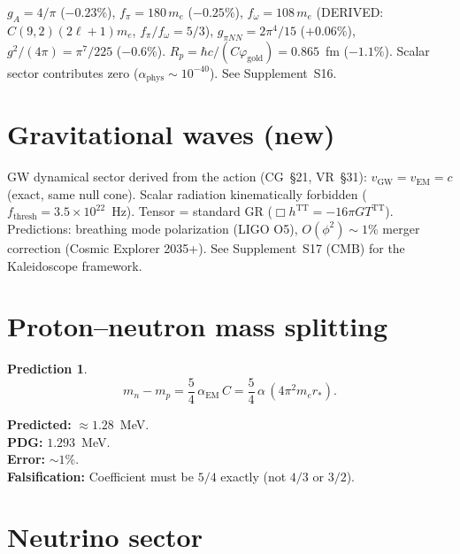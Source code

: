 \documentclass[11pt,letterpaper]{article}
\newtheorem{prediction}[theorem]{Prediction}
\numberwithin{equation}{section}
\begin{document}
$g_A = 4/\pi$ ($-0.23\%$), $f_\pi = 180\,m_e$ ($-0.25\%$),
$f_\omega = 108\,m_e$ (DERIVED: $C(9,2)(2\ell+1)m_e$, $f_\pi/f_\omega = 5/3$),
$g_{\pi NN} = 2\pi^4/15$ ($+0.06\%$),
$g^2/(4\pi) = \pi^7/225$ ($-0.6\%$).
$R_p = \hbar c/(C\varphi_\mathrm{gold}) = 0.865$~fm ($-1.1\%$).
Scalar sector contributes zero ($\alpha_\mathrm{phys} \sim 10^{-40}$).
See Supplement~S16.

\section{Gravitational waves (new)}
\label{sec:gw}

GW dynamical sector derived from the action (CG~\S21, VR~\S31):
$v_\mathrm{GW} = v_\mathrm{EM} = c$ (exact, same null cone).
Scalar radiation kinematically forbidden ($f_\mathrm{thresh} = 3.5 \times 10^{22}$~Hz).
Tensor = standard GR ($\Box h^\mathrm{TT} = -16\pi G T^\mathrm{TT}$).
Predictions: breathing mode polarization (LIGO O5),
$O(\phi^2) \sim 1\%$ merger correction (Cosmic Explorer 2035+).
See Supplement~S17 (CMB) for the Kaleidoscope framework.

\section{Proton--neutron mass splitting}
\label{sec:pn}

\begin{prediction}
\begin{equation}
  m_n - m_p = \frac{5}{4}\,\alpha_\mathrm{EM}\,C = \frac{5}{4}\,\alpha\,(4\pi^2 m_e r_*).
\end{equation}
\end{prediction}

\noindent\textbf{Predicted:} $\approx 1.28$~MeV.\\
\textbf{PDG:} $1.293$~MeV.\\
\textbf{Error:} $\sim 1\%$.\\
\textbf{Falsification:} Coefficient must be $5/4$ exactly (not $4/3$ or $3/2$).

\section{Neutrino sector}
\label{sec:neutrino}
\end{document}
